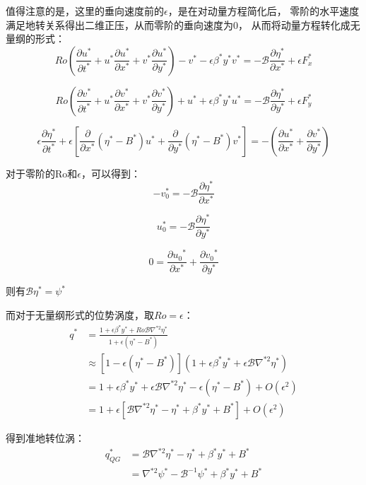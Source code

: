 \documentclass{article}
\begin{document}
值得注意的是，这里的垂向速度前的$\epsilon$，是在对动量方程简化后，
零阶的水平速度满足地转关系得出二维正压，从而零阶的垂向速度为0，
从而将动量方程转化成无量纲的形式：
$$Ro(\frac{\partial u^*}{\partial t^*} 
+ u^*\frac{\partial u^*}{\partial x^*}
+ v^*\frac{\partial u^*}{\partial y^*}) - v^* - \epsilon \beta^*y^*v^* 
= -\mathcal{B}\frac{\partial \eta^* }{\partial x^*} + \epsilon F_x^*$$

$$Ro(\frac{\partial v^*}{\partial t^*} 
+ u^*\frac{\partial v^*}{\partial x^*}
+ v^*\frac{\partial v^*}{\partial y^*}) + u^* + \epsilon \beta^*y^*u^* 
= -\mathcal{B}\frac{\partial \eta^* }{\partial y^*} + \epsilon F_y^*$$

$$\epsilon \frac{\partial {{\eta }^{*}}}{\partial {{t}^{*}}}
+\epsilon \left[ \frac{\partial }{\partial {{x}^{*}}}({{\eta }^{*}}
-{{B}^{*}}){{u}^{*}}+\frac{\partial }{\partial {{y}^{*}}}({{\eta }^{*}}
-{{B}^{*}}){{v}^{*}} \right]
=-\left( \frac{\partial {{u}^{*}}}{\partial {{x}^{*}}}
+\frac{\partial {{v}^{*}}}{\partial {{y}^{*}}} \right)$$

对于零阶的Ro和$\epsilon$，可以得到：
$$ - v_0^* 
= -\mathcal{B}\frac{\partial \eta^* }{\partial x^*} $$

$$ u_0^* 
= -\mathcal{B}\frac{\partial \eta^* }{\partial y^*} $$

$$0
= \frac{\partial {{u_0}^{*}}}{\partial {{x}^{*}}}
+\frac{\partial {{v_0}^{*}}}{\partial {{y}^{*}}} $$

则有$\mathcal{B}\eta^* = \psi^*$

而对于无量纲形式的位势涡度，取$Ro=\epsilon$：
\begin{align*}    
    q^* & =\frac{1+\epsilon\beta^*y^*+Ro\mathcal{B}\nabla^{*2}\eta^*}{1+\epsilon(\eta^*-B^*)} \\     
    & \approx \left[ 1-\epsilon\left( \eta^*-B^* \right) \right]\left( 1+\epsilon\beta^*y^*+\epsilon\mathcal{B}\nabla^{*2}\eta^* \right) \\    
    & = 1+\epsilon\beta^*y^*+\epsilon\mathcal{B}\nabla^{*2}\eta^*-\epsilon\left( \eta^*-B^* \right) + O(\epsilon^2) \\    
    & = 1+\epsilon\left[ \mathcal{B}\nabla^{*2}\eta^* - \eta^* + \beta^*y^* + B^* \right] + O(\epsilon^2)
\end{align*}

得到准地转位涡：
\begin{align*}    
    q^*_{QG} & =\mathcal{B}\nabla^{*2}\eta^* - \eta^* + \beta^*y^* + B^* \\
        & = \nabla^{*2}\psi^* - \mathcal{B}^{-1}\psi^* + \beta^*y^*+B^*
\end{align*}
\end{document}
